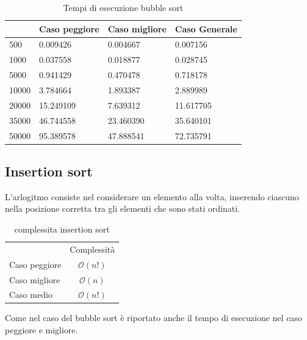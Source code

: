 \documentclass[12pt,a4paper]{report}
\begin{document}
\begin{table}[h]
\centering
\begin{tabular}{| l | l | l | l |}
\hline
      & Caso peggiore & Caso migliore & Caso Generale \\ \hline
500   & 0.009426      & 0.004667      & 0.007156      \\ \hline
1000  & 0.037558      & 0.018877      & 0.028745      \\ \hline
5000  & 0.941429      & 0.470478      & 0.718178      \\ \hline
10000 & 3.784664      & 1.893387      & 2.889989      \\ \hline
20000 & 15.249109     & 7.639312      & 11.617705     \\ \hline
35000 & 46.744558     & 23.460390     & 35.640101     \\ \hline
50000 & 95.389578     & 47.888541     & 72.735791    \\ \hline
\end{tabular}
\caption{Tempi di esecuzione bubble sort}
\label{Tab:Tempi esecuzione Bubblesort}
\end{table}

\newpage
\subsection{Insertion sort}
L'arlogitmo consiste nel considerare un elemento alla volta, inserendo ciascuno nella posizione corretta tra gli elementi che sono stati ordinati. 
\begin{table}[h]
	\centering
	\begin{tabular}{lc}
              & Complessità \\
Caso peggiore &       $ \mathcal{O}(n!)$      \\
Caso migliore &           $ \mathcal{O}(n)$   \\
Caso medio &  $ \mathcal{O}(n!)$\\
\end{tabular}
	\caption{complessita insertion sort}
	\label{Tab:CompInsertionSort}
\end{table}


	

Come nel caso del bubble sort è riportato anche il tempo di esecuzione nel caso peggiore e migliore.
\end{document}
